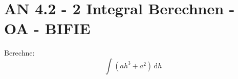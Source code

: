\section{AN 4.2 - 2 Integral Berechnen - OA - BIFIE}

\begin{beispiel}[AN 4.2]{1} %
				Berechne: $$\int{(ah^3+a^2)\,\text{d}h}$$
				\leer
				
\end{beispiel}